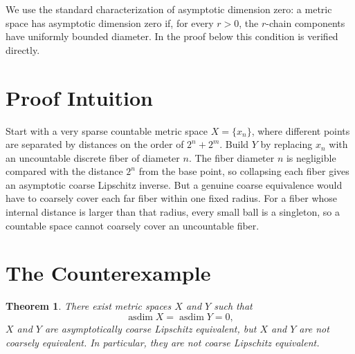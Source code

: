 \documentclass[11pt]{article}
\newtheorem{theorem}{Theorem}
\begin{document}
We use the standard characterization of asymptotic dimension zero: a metric space has
asymptotic dimension zero if, for every \(r>0\), the \(r\)-chain components have uniformly
bounded diameter.  In the proof below this condition is verified directly.

\section*{Proof Intuition}

Start with a very sparse countable metric space \(X=\{x_n\}\), where different points are
separated by distances on the order of \(2^n+2^m\).  Build \(Y\) by replacing \(x_n\) with an
uncountable discrete fiber of diameter \(n\).  The fiber diameter \(n\) is negligible compared
with the distance \(2^n\) from the base point, so collapsing each fiber gives an asymptotic
coarse Lipschitz inverse.  But a genuine coarse equivalence would have to coarsely cover each
far fiber within one fixed radius.  For a fiber whose internal distance is larger than that
radius, every small ball is a singleton, so a countable space cannot coarsely cover an
uncountable fiber.

\section*{The Counterexample}

\begin{theorem}
There exist metric spaces \(X\) and \(Y\) such that
\[
\operatorname{asdim} X=\operatorname{asdim} Y=0,
\]
\(X\) and \(Y\) are asymptotically coarse Lipschitz equivalent, but \(X\) and \(Y\) are not
coarsely equivalent.  In particular, they are not coarse Lipschitz equivalent.
\end{theorem}
\end{document}
